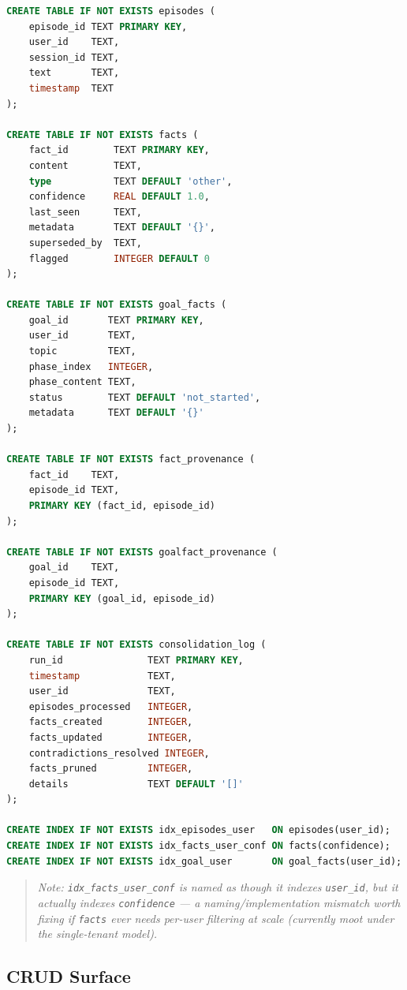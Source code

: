 \documentclass[11pt,a4paper]{report}
\newcommand{\code}[1]{\texttt{\small #1}}
\begin{document}
\begin{lstlisting}[language=SQL,caption={Table definitions (init\_db)}]
CREATE TABLE IF NOT EXISTS episodes (
    episode_id TEXT PRIMARY KEY,
    user_id    TEXT,
    session_id TEXT,
    text       TEXT,
    timestamp  TEXT
);

CREATE TABLE IF NOT EXISTS facts (
    fact_id        TEXT PRIMARY KEY,
    content        TEXT,
    type           TEXT DEFAULT 'other',
    confidence     REAL DEFAULT 1.0,
    last_seen      TEXT,
    metadata       TEXT DEFAULT '{}',
    superseded_by  TEXT,
    flagged        INTEGER DEFAULT 0
);

CREATE TABLE IF NOT EXISTS goal_facts (
    goal_id       TEXT PRIMARY KEY,
    user_id       TEXT,
    topic         TEXT,
    phase_index   INTEGER,
    phase_content TEXT,
    status        TEXT DEFAULT 'not_started',
    metadata      TEXT DEFAULT '{}'
);

CREATE TABLE IF NOT EXISTS fact_provenance (
    fact_id    TEXT,
    episode_id TEXT,
    PRIMARY KEY (fact_id, episode_id)
);

CREATE TABLE IF NOT EXISTS goalfact_provenance (
    goal_id    TEXT,
    episode_id TEXT,
    PRIMARY KEY (goal_id, episode_id)
);

CREATE TABLE IF NOT EXISTS consolidation_log (
    run_id               TEXT PRIMARY KEY,
    timestamp            TEXT,
    user_id              TEXT,
    episodes_processed   INTEGER,
    facts_created        INTEGER,
    facts_updated        INTEGER,
    contradictions_resolved INTEGER,
    facts_pruned         INTEGER,
    details              TEXT DEFAULT '[]'
);

CREATE INDEX IF NOT EXISTS idx_episodes_user   ON episodes(user_id);
CREATE INDEX IF NOT EXISTS idx_facts_user_conf ON facts(confidence);
CREATE INDEX IF NOT EXISTS idx_goal_user       ON goal_facts(user_id);
\end{lstlisting}

\begin{quote}\small\itshape
Note: \code{idx\_facts\_user\_conf} is named as though it indexes \code{user\_id}, but it actually indexes \code{confidence} — a naming/implementation mismatch worth fixing if \code{facts} ever needs per-user filtering at scale (currently moot under the single-tenant model).
\end{quote}

\subsection{CRUD Surface}
\end{document}
